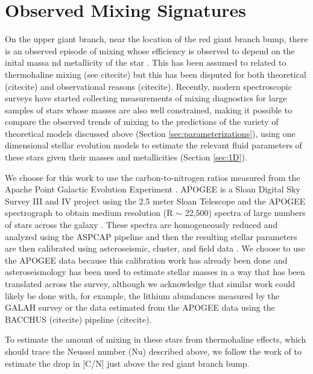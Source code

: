 \documentclass[linenumbers,twocolumn]{aastex62}
\begin{document}
\section{Observed Mixing Signatures} \label{sec:obs}
On the upper giant branch, near the location of the red giant branch bump, there is an observed episode of mixing whose efficiency is observed to depend on the inital massa nd metallicity of the star \citep[e.g.][]{Gratton2000}. This has been assumed to related to thermohaline mixing (see citecite) but this has been disputed for both theoretical (citecite) and observational reasons \citep{TayarJoyce2022} (citecite). Recently, modern spectroscopic surveys have started collecting measurements of mixing diagnostics for large samples of stars whose masses are also well constrained, making it possible to compare the observed trends of mixing to the predictions of the variety of theoretical models discussed above (Section \ref{sec:parameterizations}), using one dimensional stellar evolution models to estimate the relevant fluid parameters of these stars given their masses and metallicities (Section \ref{sec:1D}). 

We choose for this work to use the carbon-to-nitrogen ratios measured from the Apache Point Galactic Evolution Experiment \citep[APOGEE, ][]{}. APOGEE is a Sloan Digital Sky Survey III and IV \citep{Blanton2017} project using the 2.5 meter Sloan Telescope \citep{Gunn2006} and the APOGEE spectrograph \citep{Wilson2019} to obtain medium resolution (R $\sim$ 22,500) spectra of large numbers of stars across the galaxy \citep{Zasowski2017, Beaton2021,?}. These spectra are homogeneously reduced and analyzed using the ASPCAP pipeline \citep{Nidever2015, Zamora2015, GarciaPerez2016} and then the resulting stellar parameters are then calibrated using asteroseismic, cluster, and field data \citep{Holtzman2015,Holtzman2018, Jonsson2020}. We choose to use the APOGEE data because this calibration work has already been done and asteroseismology has been used to estimate stellar masses in a way that has been translated across the survey, although we acknowledge that similar work could likely be done with, for example, the lithium abundances measured by the GALAH survey \citep{buder2019} or the \ctwelvecthirteed data estimated from the APOGEE data using the BACCHUS (citecite) pipeline (citecite). 

To estimate the amount of mixing in these stars from thermohaline effects, which should trace the Neussel number (Nu) described above, we follow the work of \citet{Shetrone2019} to estimate the drop in [C/N] just above the red giant branch bump. 
\end{document}
